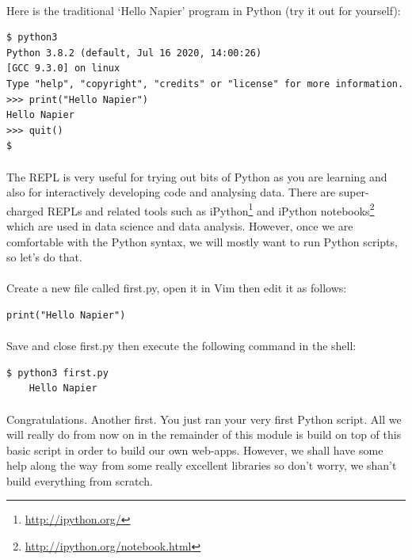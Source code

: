 \documentclass[12pt, a4paper, oneside]{book}
\begin{document}
\paragraph{} Here is the traditional `Hello Napier' program in Python (try it out for yourself):

\begin{lstlisting}[style=DOS]
$ python3
Python 3.8.2 (default, Jul 16 2020, 14:00:26) 
[GCC 9.3.0] on linux
Type "help", "copyright", "credits" or "license" for more information.
>>> print("Hello Napier")
Hello Napier
>>> quit()
$
\end{lstlisting}

\paragraph{} The REPL is very useful for trying out bits of Python as you are learning and also for interactively developing code and analysing data. There are super-charged REPLs and related tools such as iPython\footnote{\url{http://ipython.org/}} and iPython notebooks\footnote{\url{http://ipython.org/notebook.html}} which are used in data science and data analysis. However, once we are comfortable with the Python syntax, we will mostly want to run Python scripts, so let's do that.

\paragraph{} Create a new file called first.py, open it in Vim then edit it as follows:

\begin{lstlisting}
print("Hello Napier")
\end{lstlisting}

\paragraph{} Save and close first.py then execute the following command in the shell:

\begin{lstlisting}[style=DOS]
    $ python3 first.py 
    Hello Napier
\end{lstlisting}

\paragraph{} Congratulations. Another first. You just ran your very first Python script. All we will really do from now on in the remainder of this module is build on top of this basic script in order to build our own web-apps. However, we shall have some help along the way from some really excellent libraries so don't worry, we shan't build everything from scratch.
\end{document}
